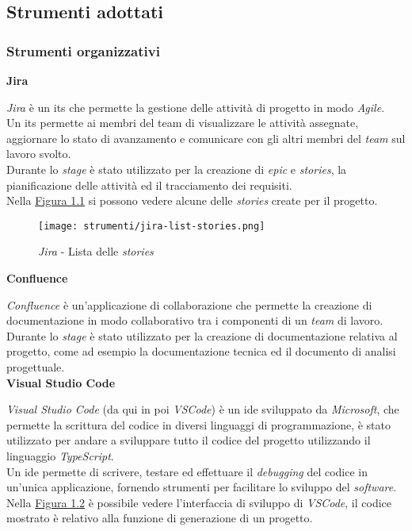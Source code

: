 \pagebreak
\subsection{Strumenti adottati}
\label{sez:strumenti-adottati}

\subsubsection{Strumenti organizzativi}
\label{sez:strumenti-organizzativi}

\noindent \textbf{Jira\\}

\noindent \textit{Jira} è un \gls{its} che permette la gestione delle attività di progetto in modo \textit{Agile}.\\
Un \gls{its} permette ai membri del team di visualizzare le attività assegnate, aggiornare lo stato di avanzamento e comunicare con gli altri membri del \textit{team} sul lavoro svolto. \\
Durante lo \textit{stage} è stato utilizzato per la creazione di \textit{epic} e \textit{stories}, la pianificazione delle attività ed il tracciamento dei requisiti. \\
Nella {\hyperref[fig:jira-list-stories]{Figura 1.1}} si possono vedere alcune delle \textit{stories} create per il progetto.
\begin{figure}[H]
    \label{fig:jira-list-stories}
    \centering
    \texttt{[image: strumenti/jira-list-stories.png]}
    \caption{\textit{Jira} - Lista delle \textit{stories}}
\end{figure}


\noindent \textbf{Confluence\\}

\noindent \textit{Confluence} è un'applicazione di collaborazione che permette la creazione di documentazione in modo collaborativo tra i componenti di un \textit{team} di lavoro.\\
Durante lo \textit{stage} è stato utilizzato per la creazione di documentazione relativa al progetto, come ad esempio la documentazione tecnica ed il documento di analisi progettuale.\\


\noindent \textbf{Visual Studio Code\\}

\noindent \textit{Visual Studio Code} (da qui in poi \textit{VSCode}) è un \gls{ide} sviluppato da \textit{Microsoft}, che permette la scrittura del codice in diversi linguaggi di programmazione, è stato utilizzato per andare
a sviluppare tutto il codice del progetto utilizzando il linguaggio \textit{TypeScript}.\\
Un \gls{ide} permette di scrivere, testare ed effettuare il \textit{debugging} del codice in un'unica applicazione, fornendo strumenti per facilitare lo sviluppo del \textit{software}.\\
Nella {\hyperref[fig:vscode]{Figura 1.2}} è possibile vedere l'interfaccia di sviluppo di \textit{VSCode}, il codice mostrato è relativo alla funzione di generazione di un progetto.


